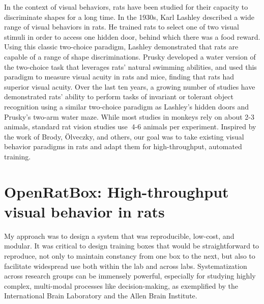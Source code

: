 In the context of visual behaviors, rats have been studied for their capacity to discriminate shapes for a long time. In the 1930s, Karl Lashley\cite{Lashley1930} described a wide range of visual behaviors in rats. He trained rats to select one of two visual stimuli in order to access one hidden door, behind which there was a food reward\cite{Lashley1938}. Using this classic two-choice paradigm, Lashley demonstrated that rats are capable of a range of shape discriminations. Prusky developed a water version of the two-choice task that leverages rats' natural swimming abilities, and used this paradigm to measure visual acuity in rats and mice, finding that rats had superior visual acuity\cite{Prusky2000}. Over the last ten years, a growing number of studies have demonstrated rats' ability to perform tasks of invariant or tolerant object recognition using a similar two-choice paradigm as Lashley's hidden doors and Prusky's two-arm water maze\cite{Zoccolan2009, Vermaercke2012, Tafazoli2012, Alemi-Neissi2013, Djurdjevic2018}. While most studies in monkeys rely on about 2-3 animals, standard rat vision studies use $~$4-6 animals per experiment. Inspired by the work of Brody, {\"O}lveczky, and others, our goal was to take existing visual behavior paradigms in rats and adapt them for high-throughput, automated training. 


\section{OpenRatBox: High-throughput visual behavior in rats}
My approach was to design a system that was reproducible, low-cost, and modular. It was critical to design training boxes that would be straightforward to reproduce, not only to maintain constancy from one box to the next, but also to facilitate widespread use both within the lab and across labs. Systematization across research groups can be immensely powerful, especially for studying highly complex, multi-modal processes like decision-making, as exemplified by the International Brain Laboratory and the Allen Brain Institute.


